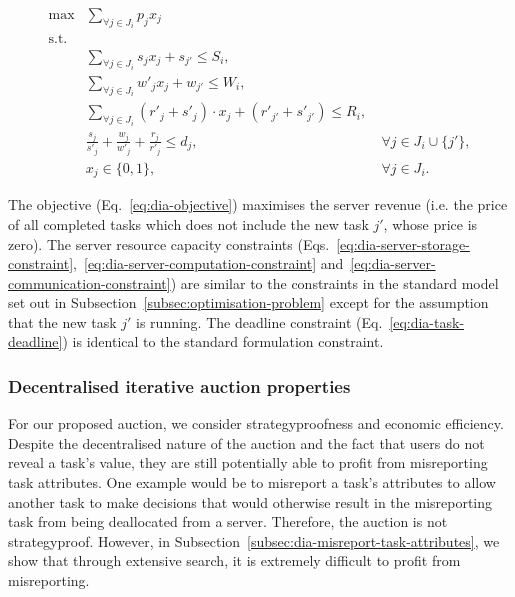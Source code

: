 \begin{align}
    \max & \sum_{\forall j \in J_i} p_j x_j\label{eq:dia-objective}\\
    \mbox{s.t.} \nonumber \\
    & \sum_{\forall j \in J_i} s_j x_j + s_{j'} \leq S_i,\label{eq:dia-server-storage-constraint}\\
    & \sum_{\forall j \in J_i} w'_j x_j + w_{j'} \leq W_i, \label{eq:dia-server-computation-constraint}\\
    & \sum_{\forall j \in J_i} (r'_j + s'_j) \cdot x_j + (r'_{j'} + s'_{j'}) \leq R_i, \label{eq:dia-server-communication-constraint}\\
    & \frac{s_j}{s'_j} + \frac{w_j}{w'_j} + \frac{r_j}{r'_j} \leq d_j, &~ \forall j \in J_i \cup \{j'\}, \label{eq:dia-task-deadline}\\
    & x_j \in \{0,1\}, &~ \forall{j \in J_i}. \label{eq:dia-task-allocation}
\end{align}

The objective (Eq.~\eqref{eq:dia-objective}) maximises the server revenue (i.e. the price of all completed tasks which does not include the new task $j'$, whose price is zero). The server resource capacity constraints (Eqs.~\eqref{eq:dia-server-storage-constraint},~\eqref{eq:dia-server-computation-constraint} and~\eqref{eq:dia-server-communication-constraint}) are similar to the constraints in the standard model set out in Subsection~\ref{subsec:optimisation-problem} except for the assumption that the new task $j'$ is running. The deadline constraint (Eq.~\eqref{eq:dia-task-deadline}) is identical to the standard formulation constraint. 

\subsubsection{Decentralised iterative auction properties}
\label{subsubsec:decentralised-iterative-auction-properties}
For our proposed auction, we consider strategyproofness and economic efficiency. Despite the decentralised nature of the auction and the fact that users do not reveal a task's value, they are still potentially able to profit from misreporting task attributes. One example would be to misreport a task's attributes to allow another task to make decisions that would otherwise result in the misreporting task from being deallocated from a server. Therefore, the auction is not strategyproof. However, in Subsection~\ref{subsec:dia-misreport-task-attributes}, we show that through extensive search, it is extremely difficult to profit from misreporting.


